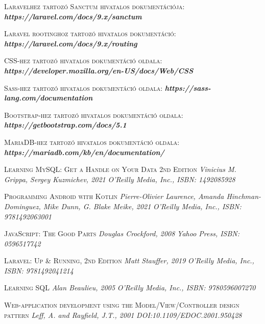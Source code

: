 \documentclass[
]{thesis-ekf}
\theoremstyle{definition}
\theoremstyle{remark}
\begin{document}
\begin{thebibliography}{2}
\textsc{Laravelhez tartozó Sanctum hivatalos dokumentációja:}
\newline
\emph{\bf{https://laravel.com/docs/9.x/sanctum}}

\textsc{Laravel rootinghoz tartozó hivatalos dokumentáció:}
\newline
\emph{\bf{https://laravel.com/docs/9.x/routing}}

\textsc{CSS-hez tartozó hivatalos dokumentáció oldala:}
\newline
\emph{\bf{https://developer.mozilla.org/en-US/docs/Web/CSS}}

\textsc{Sass-hez tartozó hivatalos dokumentáció oldala:}
\newline
\emph{\bf{https://sass-lang.com/documentation}}

\textsc{Bootstrap-hez tartozó hivatalos dokumentáció oldala:}
\newline
\emph{\bf{https://getbootstrap.com/docs/5.1}}

\textsc{MariaDB-hez tartozó hivatalos dokumentáció oldala:}
\newline
\emph{\bf{https://mariadb.com/kb/en/documentation/}}

\textsc{Learning MySQL: Get a Handle on Your Data 2nd Edition}
\newline
\emph{Vinicius M. Grippa, Sergey Kuzmichev,  2021}
\emph{O'Reilly Media, Inc., ISBN: 1492085928}

\textsc{Programming Android with Kotlin}
\newline
\emph{Pierre-Olivier Laurence, Amanda Hinchman-Dominguez, Mike Dunn, G. Blake Meike,  2021}
\emph{O'Reilly Media, Inc., ISBN: 9781492063001}

\textsc{JavaScript: The Good Parts}
\newline
\emph{Douglas Crockford, 2008}
\emph{Yahoo Press, ISBN: 0596517742}

\textsc{Laravel: Up \& Running, 2nd Edition}
\newline
\emph{Matt Stauffer, 2019}
\emph{O'Reilly Media, Inc., ISBN: 9781492041214}

\textsc{Learning SQL}
\newline
\emph{Alan Beaulieu, 2005}
\emph{O'Reilly Media, Inc., ISBN: 9780596007270}

\textsc{Web-application development using the Model/View/Controller design pattern}
\newline
\emph{Leff, A. and Rayfield, J.T., 2001}
\emph{DOI:10.1109/EDOC.2001.950428}


\end{thebibliography}
\end{document}
